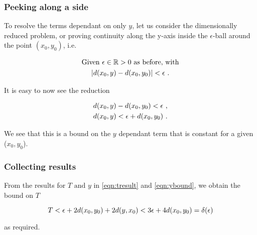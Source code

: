 \begin{frame}
    \frametitle{Peeking along a side}

    To resolve the terms dependant on only \(y\), let us consider
    the dimensionally reduced problem, or proving continuity along the y-axis
    inside the \(\epsilon\)-ball around the point \((x_0, y_0)\), i.e.

    \begin{gather*}
        \text{Given } \epsilon \in \mathbb{R} > 0 \text{ as before, with} \\
        |d(x_0, y) - d(x_0, y_0)| <
        \epsilon~.
    \end{gather*}

    \pause

    It is easy to now see the reduction

    \begin{gather}
        d(x_0, y) - d(x_0, y_0) < \epsilon~, \nonumber \\
        d(x_0, y) < \epsilon + d(x_0, y_0)~.
        \label{eqn:ybound}
    \end{gather}

    We see that this is a bound on the \(y\) dependant term that is constant
    for a given (\(x_0, y_0\)).

\end{frame}

\begin{frame}
    \frametitle{Collecting results}

    From the results for \(T \text{ and } y\) in \autoref{eqn:tresult} and
    \autoref{eqn:ybound}, we obtain the bound on \(T\)

    \begin{equation}
        T < \epsilon + 2d(x_0, y_0) + 2d(y, x_0) < 3\epsilon + 4d(x_0, y_0) = \delta(\epsilon)
    \end{equation}

    as required.

\end{frame}


